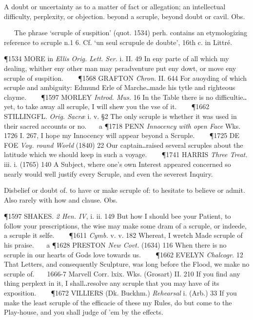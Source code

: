 \begin{description}[wide, labelwidth=!, labelindent=0pt]
\begin{myenumerate}
 A doubt or uncertainty as to a matter of fact or allegation; an intellectual difficulty, perplexity, or objection. beyond a scruple, beyond doubt or cavil. Obs.

   The phrase ‘scruple of suspition’ (quot. 1534) perh. contains an etymologizing reference to scruple n.1 6. Cf. ‘un seul scrupule de doubte’, 16th c. in Littré.

\P 1534 MORE in  \textit{Ellis Orig. Lett. Ser.} i. II. 49 In eny parte of all which my dealing, whither eny other man may peradventure put eny dowt, or move eny scruple of suspition.    
\P 1568 GRAFTON  \textit{Chron.} II. 644 For auoyding of which scruple and ambiguity: Edmund Erle of Marche‥made his tytle and righteous clayme.    
\P 1597 MORLEY  \textit{Introd. Mus.} 16 In the Table there is no difficultie‥yet, to take away all scruple, I will shew you the vse of it.    
\P 1662 STILLINGFL.  \textit{Orig. Sacræ} i. v. §2 The only scruple is whether it was used in their sacred accounts or no.    a 
\P 1718 PENN  \textit{Innocency with open Face} Wks. 1726 I. 267,  I hope my Innocency will appear beyond a Scruple.    
\P 1725 DE FOE  \textit{Voy. round World} (1840) 22 Our captain‥raised several scruples about the latitude which we should keep in such a voyage.    
\P 1741 HARRIS  \textit{Three Treat.} iii. i. (1765) 140 A Subject, where one's own Interest appeared concerned so nearly would well justify every Scruple, and even the severest Inquiry.

 Disbelief or doubt of. to have or make scruple of: to hesitate to believe or admit. Also rarely with how and clause. Obs.

\P 1597 SHAKES.  \textit{2 Hen. IV}, i. ii. 149 But how I should bee your Patient, to follow your prescriptions, the wise may make some dram of a scruple, or indeede, a scruple it selfe.    
\P 1611 \textit{Cymb.} v. v. 182 Whereat, I wretch Made scruple of his praise.    a 
\P 1628 PRESTON  \textit{New Covt.} (1634) 116 When there is no scruple in our hearts of Gods love towards us.    
\P 1662 EVELYN  \textit{Chalcogr.} 12 That Letters, and consequently Sculpture, was long before the Flood, we make no scruple of.    1666-7 Marvell Corr. lxix. Wks. (Grosart) II. 210 If you find any thing perplext in it, I shall‥resolve any scruple that you may have of its exposition.    
\P 1672 VILLIERS  (Dk. Buckhm.) \textit{Rehearsal} i. (Arb.) 33 If you make the least scruple of the efficacie of these my Rules, do but come to the Play-house, and you shall judge of 'em by the effects.


\end{myenumerate}
\end{description}
